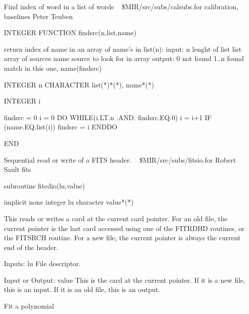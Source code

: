 %
\noindent Find index of word in a list of words
\newline \ 
\newline {} \$MIR/src/subs/calsubs.for
\newline {} calibration, baselines
\newline {} Peter Teuben
\par{\tenpoint
{\eightpoint\begintt
        INTEGER FUNCTION findsrc(n,list,name)

   return index of name in an array of name's in list(n):
       input:   n      lenght of list
                list   array of sources
                name   source to look for in array
       output:
       0       not found
       1..n    found match in this one, name(findsrc)

        INTEGER   n
        CHARACTER list(*)*(*), name*(*)

        INTEGER i

        findsrc = 0
        i = 0
        DO WHILE(i.LT.n .AND. findsrc.EQ.0)
            i = i+1
            IF (name.EQ.list(i)) findsrc = i
        ENDDO

        END
\endtt}
\par}
%
\noindent Sequential read or write of a FITS header.
\newline \ 
\newline {} \$MIR/src/subs/fitsio.for
\newline {} Robert Sault
\newline \abox{Keywords:} fits
\par{\tenpoint
{\eightpoint\begintt
        subroutine fitcdio(lu,value)

        implicit none
        integer lu
        character value*(*)

  This reads or writes a card at the current card pointer. For an old
  file, the current pointer is the last card accessed using one of
  the FITRDHD routines, or the FITSRCH routine. For a new file, the
  current pointer is always the current end of the header.

  Inputs:
    lu         File descriptor.

  Input or Output:
    value      This is the card at the current pointer. If it is a new
               file, this is an input. If it is an old file, this is an
               output.
\endtt}
\par}
%
\noindent Fit a polynomial
\newline \ 
